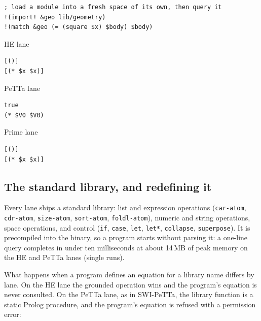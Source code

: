 \documentclass[11pt]{article}
\newcommand{\code}[1]{\texttt{#1}}
\newcommand{\outhead}[1]{{\footnotesize\sffamily #1}\par\vspace{1pt}}
\newcommand{\PeTTa}{\textup{PeTTa}}
\newcommand{\HE}{\textup{HE}}
\begin{document}
\begin{lstlisting}[style=metta,caption={Importing a module into a space of its own},label={lst:t06b}]
; load a module into a fresh space of its own, then query it
!(import! &geo lib/geometry)
!(match &geo (= (square $x) $body) $body)
\end{lstlisting}
\noindent\begin{minipage}[t]{0.32\textwidth}
\outhead{HE lane}
\begin{lstlisting}[style=out]
[()]
[(* $x $x)]
\end{lstlisting}
\end{minipage}\hfill
\begin{minipage}[t]{0.32\textwidth}
\outhead{PeTTa lane}
\begin{lstlisting}[style=out]
true
(* $V0 $V0)
\end{lstlisting}
\end{minipage}\hfill
\begin{minipage}[t]{0.32\textwidth}
\outhead{Prime lane}
\begin{lstlisting}[style=out]
[()]
[(* $x $x)]
\end{lstlisting}
\end{minipage}

\subsection{The standard library, and redefining it}
\label{sec:tut-stdlib}

Every lane ships a standard library: list and expression operations
(\code{car-atom}, \code{cdr-atom}, \code{size-atom}, \code{sort-atom},
\code{foldl-atom}), numeric and string operations, space operations, and
control (\code{if}, \code{case}, \code{let}, \code{let*}, \code{collapse},
\code{superpose}).  It is precompiled into the binary, so a program starts
without parsing it: a one-line query completes in under ten milliseconds at
about 14\,MB of peak memory on the \HE{} and \PeTTa{} lanes (single runs).

What happens when a program defines an equation for a library name differs by
lane.  On the \HE{} lane the grounded operation wins and the program's
equation is never consulted.  On the \PeTTa{} lane, as in SWI-\PeTTa{}, the
library function is a static Prolog procedure, and the program's equation is
refused with a permission error:
\end{document}
